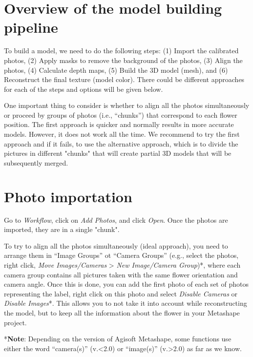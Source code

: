 \documentclass[
]{book}
\begin{document}
\hypertarget{overview-of-the-model-building-pipeline}{%
\section{Overview of the model building pipeline}\label{overview-of-the-model-building-pipeline}}

To build a model, we need to do the following steps: (1) Import the
calibrated photos, (2) Apply masks to remove the background of the photos, (3)
Align the photos, (4) Calculate depth maps, (5) Build the 3D model (mesh), and
(6) Reconstruct the final texture (model color). There could be different approaches
for each of the steps and options will be given below.

One important thing to consider is whether to align all the photos simultaneously
or proceed by groups of photos (i.e., ``chunks'') that correspond to each flower position.
The first approach is quicker and normally results in more accurate models.
However, it does not work all the time. We recommend to try the first approach and if it
fails, to use the alternative approach, which is to divide the pictures in different
"chunks" that will create partial 3D models that will be subsequently merged.

\hypertarget{photo-importation}{%
\section{Photo importation}\label{photo-importation}}

Go to \emph{Workflow}, click on \emph{Add Photos}, and click \emph{Open}. Once the
photos are imported, they are in a single "chunk".

To try to align all the photos simultaneously (ideal approach), you need
to arrange them in ``Image Groups'' ot ``Camera Groups'' (e.g., select the photos, right click, \emph{Move Images/Cameras} \textgreater{} \emph{New Image/Camera Group})*, where each camera group contains
all pictures taken with the same flower orientation and camera angle. Once this is done,
you can add the first photo of each set of photos representing the
label, right click on this photo and select \emph{Disable Cameras} or \emph{Disable Images}*. This
allows you to not take it into account while reconstructing the model,
but to keep all the information about the flower in your Metashape
project.

*\textbf{Note}: Depending on the version of Agisoft Metashape, some functions use either the word
``camera(s)'' (v.\textless2.0) or ``image(s)'' (v.\textgreater2.0) as far as we know.
\end{document}
